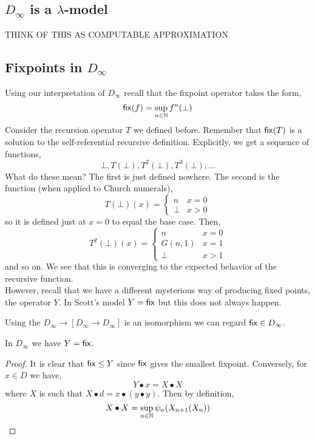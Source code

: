 \documentclass[12pt]{article}
\begin{document}
\subsection{$D_\infty$ is a $\lambda$-model}

THINK OF THIS AS COMPUTABLE APPROXIMATION

\subsection{Fixpoints in $D_{\infty}$}

Using our interpretation of $D_{\infty}$ recall that the fixpoint operator takes the form,
\[ \mathsf{fix}(f) = \sup_{n \in \mathbb{N}} f^n(\bot) \]
Consider the recursion operator $T$ we defined before. Remember that $\mathsf{fix}(T)$ is a solution to the self-referential recursive definition. Explicitly, we get a sequence of functions,
\[ \bot, T(\bot), T^2(\bot), T^3(\bot), \dots \]
What do these mean? The first is just defined nowhere. The second is the function (when applied to Church numerals),
\[ T(\bot)(x) = \begin{cases}
n & x = 0
\\
\bot & x > 0
\end{cases} \]
so it is defined just at $x = 0$ to equal the base case. Then,
\[  T^2(\bot)(x) = 
\begin{cases}
n & x = 0
\\
G(n, 1) & x = 1
\\
\bot & x > 1
\end{cases}
\]
and so on. We see that this is converging to the expected behavior of the recursive function. 
\bigskip\\
However, recall that we have a different mysterious way of producing fixed points, the operator $Y$. In Scott's model $Y = \mathsf{fix}$ but this does not always happen.

\begin{rmk}
Using the $D_{\infty} \to [D_{\infty} \to D_{\infty}]$ is an isomorphism we can regard $\mathsf{fix} \in D_{\infty}$. 
\end{rmk}

\begin{prop}
In $D_{\infty}$ we have $Y = \mathsf{fix}$.
\end{prop}

\begin{proof}
It is clear that $\mathsf{fix} \le Y$ since $\mathsf{fix}$ gives the smallest fixpoint. Conversely, for $x \in D$ we have,
\[ Y \bullet x = X \bullet X \]
where $X$ is such that $X \bullet d = x \bullet (y \bullet y)$. Then by definition,
\[ X \bullet X = \sup_{n \in \mathbb{N}} \psi_n(X_{n+1}(X_n)) \]
\end{proof}
\end{document}
